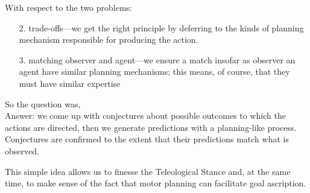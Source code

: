 \documentclass[12pt,\papersize]{extarticle}
\begin{document}
With respect to the two problems:
 \begin{itemize}
\item[2.] trade-offs---we get the right principle by deferring to the kinds of planning mechanism responsible for producing the action.
\item[3.] matching observer and agent---we ensure a match insofar as observer an agent have similar planning mechanisms; this means, of course, that they must have similar expertise
\end{itemize}

So the question was, 
\theQuestion \\
Answer: we come up with conjectures about possible outcomes to which the actions are directed, then we generate predictions with a planning-like process.  Conjectures are confirmed to the extent that their  predictions match what is observed.

This simple idea allows us to finesse the Teleological Stance and, at the same time, to make sense of the fact that motor planning can facilitate goal ascription.
\end{document}
